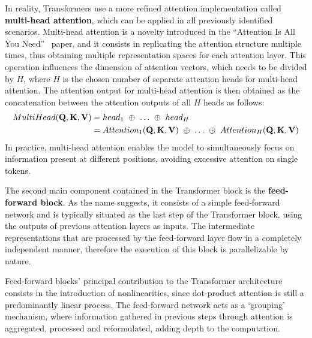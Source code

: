 In reality, Transformers use a more refined attention implementation called \textbf{multi-head attention}, which can be applied in all previously identified scenarios.
Multi-head attention is a novelty introduced in the ``Attention Is All You Need''~\cite{vaswani2017} paper, and it consists in replicating the attention structure multiple times, thus obtaining multiple representation spaces for each attention layer.
This operation influences the dimension of attention vectors, which needs to be divided by $H$, where $H$ is the chosen number of separate attention heads for multi-head attention.
The attention output for multi-head attention is then obtained as the concatenation between the attention outputs of all $H$ heads as follows:
\begin{equation}
    \label{eq:background_multihead-attention}
    \begin{aligned}
    MultiHead(\gbm{Q},\gbm{K},\gbm{V})    &= head_1\ \oplus\ \ldots\ \oplus\ head_H \\
                        &= Attention_1(\gbm{Q},\gbm{K},\gbm{V})\ \oplus\ \ldots\ \oplus\ Attention_H(\gbm{Q},\gbm{K},\gbm{V})
    \end{aligned}
\end{equation}
In practice, multi-head attention enables the model to simultaneously focus on information present at different positions, avoiding excessive attention on single tokens.

The second main component contained in the Transformer block is the \textbf{feed-forward block}.
As the name suggests, it consists of a simple feed-forward network and is typically situated as the last step of the Transformer block, using the outputs of previous attention layers as inputs.
The intermediate representations that are processed by the feed-forward layer flow in a completely independent manner, therefore the execution of this block is parallelizable by nature.

Feed-forward blocks' principal contribution to the Transformer architecture consists in the introduction of nonlinearities, since dot-product attention is still a predominantly linear process.
The feed-forward network acts as a `grouping' mechanism, where information gathered in previous steps through attention is aggregated, processed and reformulated, adding depth to the computation.

